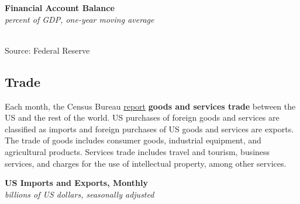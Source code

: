 \documentclass{report}
\makeatletter
\newcommand{\tbllink}[1]{\href{https://raw.githubusercontent.com/bdecon/US-chartbook/master/chartbook/data/#1}{\faTable}}
\newcommand*\short[1]{\expandafter\@gobbletwo\number\numexpr#1\relax}
\newcommand{\sbar}[4]{
		\addplot[ybar stacked, bar width=2.4pt, draw opacity=0, fill=#1] 
			table [x=#2, y=#3, col sep=comma]{#4};}
\newcommand{\absnode}[3]{\node[below right, align=left] at (axis cs: #1,#2) {#3};}
\newcommand{\dateaxisticks}{
		date coordinates in=x, axis line style={draw=none},
		xmax={2022-10-31},
		max space between ticks=40,	    
		xtick={{1990-01-01}, {1992-01-01}, {1994-01-01}, 
			{1996-01-01}, {1998-01-01}, {2000-01-01}, 
			{2002-01-01}, {2004-01-01}, {2006-01-01},
			{2008-01-01}, {2010-01-01}, {2012-01-01}, {2014-01-01},
		    {2016-01-01}, {2018-01-01}, {2020-01-01}, {2022-01-01}, 
		    {2024-01-01}, {2026-01-01}},
		minor xtick={{1989-01-01}, {1991-01-01}, {1993-01-01},
			{1995-01-01}, {1997-01-01}, {1999-01-01}, 
			{2001-01-01}, {2003-01-01}, {2005-01-01}, {2007-01-01},
		    {2009-01-01}, {2011-01-01}, {2013-01-01}, {2015-01-01},
		    {2017-01-01}, {2019-01-01}, {2021-01-01}, {2023-01-01}, 
		    {2025-01-01}, {2027-01-01}},
		enlarge y limits={0.06}, enlarge x limits={0.01},
		}
\newcommand{\ltdateaxisticks}{
		date coordinates in=x, axis line style={draw=none},
		xmax={2022-10-31},
		max space between ticks=40,	    
		xtick={{2013-01-01}, {2014-01-01}, {2015-01-01}, {2016-01-01}, {2017-01-01}, {2018-01-01}, 
		    {2019-01-01}, {2020-01-01}, {2021-01-01}, {2022-01-01}},
		enlarge y limits={0.06}, enlarge x limits={0.01},
		}
\newcommand{\bbar}[2]{extra #1 ticks = {{#2}}, extra #1 tick labels = ,
		extra #1 tick style = {grid=major, grid style={thick, black!25}},}
\newcommand{\stdline}[4]{\addplot[very thick, no markers, color=#1] 
		table [x=#2, y=#3, col sep=comma] {#4};	}
\newcommand{\rbars}{
		\fill[color=black!10] (axis cs:{1990-07-01},\pgfkeysvalueof{/pgfplots/ymin}) rectangle 
			(axis cs:{1991-03-01}, \pgfkeysvalueof{/pgfplots/ymax});
		\fill[color=black!10] (axis cs:{2007-12-01},\pgfkeysvalueof{/pgfplots/ymin}) rectangle 
			(axis cs:{2009-07-01}, \pgfkeysvalueof{/pgfplots/ymax});
		\fill[color=black!10] (axis cs:{2001-03-01},\pgfkeysvalueof{/pgfplots/ymin}) rectangle 
			(axis cs:{2001-11-01}, \pgfkeysvalueof{/pgfplots/ymax});
		\fill[color=black!10] (axis cs:{2020-02-01},\pgfkeysvalueof{/pgfplots/ymin}) rectangle 
			(axis cs:{2020-05-01}, \pgfkeysvalueof{/pgfplots/ymax});}
\newcommand{\rbar}{
		\fill[color=black!10] (axis cs:{2020-02-01},\pgfkeysvalueof{/pgfplots/ymin}) rectangle 
			(axis cs:{2020-05-01}, \pgfkeysvalueof{/pgfplots/ymax});}
\makeatother
\begin{document}
{\begin{minipage}{0.76\textwidth}
\normalsize \textbf{Financial Account Balance}\\
\footnotesize{\textit{percent of GDP, one-year moving average}}\\
\hspace*{-2mm} \\
\footnotesize{Source: Federal Reserve} \hfill \tbllink{fabz1.csv}
\end{minipage}
\newpage
\hypertarget{extt}{}
\begin{minipage}{0.76\textwidth}
\subsection*{Trade}
\small Each month, the Census Bureau \href{https://www.census.gov/foreign-trade/Press-Release/current\_press\_release/index.html}{report} \textbf{goods and services trade} between the US and the rest of the world. US purchases of foreign goods and services are classified as imports and foreign purchases of US goods and services are exports. The trade of goods includes consumer goods, industrial equipment, and agricultural products. Services trade includes travel and tourism, business services, and charges for the use of intellectual property, among other services. 
\end{minipage}
\vspace{1mm}

\begin{minipage}{0.37\textwidth}
\normalsize \textbf{US Imports and Exports, Monthly}\\
\footnotesize{\textit{billions of US dollars, seasonally adjusted}}\\
\hspace*{-2mm} 
\vspace{-2mm}


\end{minipage}}
\end{document}
